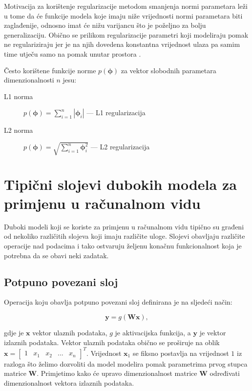 \documentclass[times, utf8, diplomski, numeric]{fer}
\begin{document}
Motivacija za korištenje regularizacije metodom smanjenja normi parametara leži u tome da će funkcije modela koje imaju niže vrijednosti normi parametara biti zaglađenije, odnosno imat će nižu varijancu što je poželjno za bolju generalizaciju.
Obično se prilikom regularizacije parametri koji modeliraju pomak ne regulariziraju jer je na njih dovedena konstantna vrijednost ulaza pa samim time utječu samo na pomak unutar prostora \citep{seminar:rela}.

Često korištene funkcije norme $p(\boldsymbol{\phi})$ za vektor slobodnih parametara dimenzionalnosti $n$ jesu:
\begin{description}
 \item [L1 norma] $p(\boldsymbol{\phi})=\sum_{i=1}^n \left| \boldsymbol{\phi}_i \right|$ --- L1  regularizacija
 \item [L2 norma] $p(\boldsymbol{\phi})=\sqrt{\sum_{i=1}^n  \boldsymbol{\phi}_i^2 }$ --- L2  regularizacija
 
\end{description}

\section{Tipični slojevi dubokih modela za primjenu u računalnom vidu}
Duboki modeli koji se koriste za primjenu u računalnom vidu tipično su građeni od nekoliko različitih slojeva koji imaju različite uloge.
Slojevi obavljaju različite operacije nad podacima i tako ostvaruju željenu konačnu funkcionalnost koja je potrebna da se obavi neki zadatak.

\subsection{Potpuno povezani sloj}
Operacija koju obavlja potpuno povezani sloj definirana je na sljedeći način:

\begin{equation}
 \mathbf{y}=g(\mathbf{W}\mathbf{x}),
\end{equation}

\noindent gdje je $\mathbf{x}$ vektor ulaznih podataka, $g$ je aktivacijska funkcija, a  $\mathbf{y}$ je vektor izlaznih podataka. 
Vektor ulaznih podataka obično se proširuje na oblik $\mathbf{x} = \begin{bmatrix} 1 & x_1 & x_2 & ... & x_n \end{bmatrix}^T$.
Vrijednost $\mathbf{x}_1$ se fiksno postavlja na vrijednost $1$ iz razloga što želimo dozvoliti da model modelira pomak parametrima prvog stupca matrice $\mathbf{W}$.
Primjetimo kako će upravo dimenzionalnost matrice $\mathbf{W}$ određivati dimenzionalnost vektora izlaznih podataka.
\end{document}
